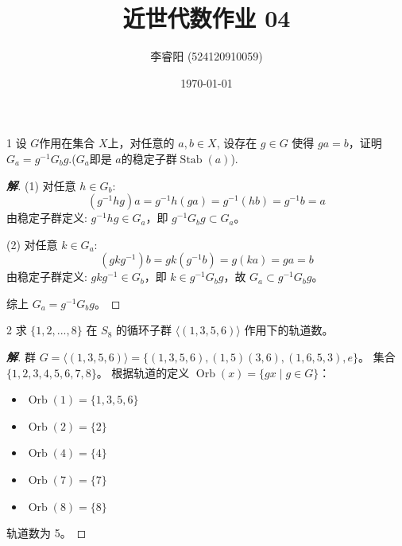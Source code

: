 \documentclass[12pt, a4paper]{article}
\title{近世代数作业 04}
\author{李睿阳 (524120910059)}
\date{\today}
\newenvironment{solution}{
    \begin{proof}[\textbf{解}]
}{
    \end{proof}
}
\begin{document}
\maketitle


\begin{problem}{1}
    设 $G$作用在集合 $X$上，对任意的 $a,b\in X$, 设存在 $g\in G$ 使得 $ga=b$，证明 $G_a=g^{-1}G_bg$.($G_a$即是 $a$的稳定子群$\operatorname{Stab}(a)$).
\end{problem}
\begin{solution}
    (1) 对任意 $h \in G_b$:
    \[ (g^{-1}hg)a = g^{-1}h(ga) = g^{-1}(hb) = g^{-1}b = a \]
    由稳定子群定义: $g^{-1}hg \in G_a$，即 $g^{-1}G_b g \subset G_a$。

    (2) 对任意 $k \in G_a$:
    \[ (gkg^{-1})b = gk(g^{-1}b) = g(ka) = ga = b \]
    由稳定子群定义: $gkg^{-1} \in G_b$，即 $k \in g^{-1}G_b g$，故 $G_a \subset g^{-1}G_b g$。

    综上 $G_a=g^{-1}G_bg$。
\end{solution}


\begin{problem}{2}
    求 $\{1,2,...,8\}$ 在 $S_8$ 的循环子群 $\langle(1,3,5,6)\rangle$ 作用下的轨道数。
\end{problem}
\begin{solution}
    群 $G = \langle(1,3,5,6)\rangle = \{(1,3,5,6), (1,5)(3,6), (1,6,5,3), e\}$。
    集合 $\{1,2,3,4,5,6,7,8\}$。
    根据轨道的定义 $\operatorname{Orb}(x) = \{gx \mid g \in G\}$：
    \begin{itemize}
        \item $\operatorname{Orb}(1) = \{1,3,5,6\}$
        \item $\operatorname{Orb}(2) = \{2\}$
        \item $\operatorname{Orb}(4) = \{4\}$
        \item $\operatorname{Orb}(7) = \{7\}$
        \item $\operatorname{Orb}(8) = \{8\}$
    \end{itemize}
    轨道数为 5。
\end{solution}
\end{document}

